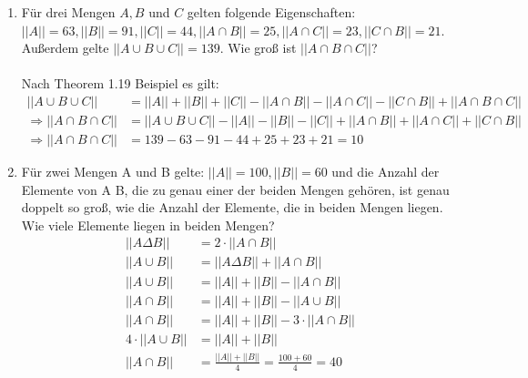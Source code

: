 \begin{enumerate}[label=(\alph*)]
        \item Für drei Mengen $A, B$ und $C$ gelten folgende Eigenschaften: 
        $||A|| = 63, ||B|| = 91, ||C|| = 44, ||A\cap B|| = 25, ||A\cap C|| = 23, ||C \cap B|| = 21$. 
        Außerdem gelte $||A\cup B\cup C|| = 139$. Wie groß ist $||A \cap B \cap C||$?\\\\
        Nach Theorem 1.19 Beispiel es gilt:
        \begin{align*}
	        ||A\cup B\cup C|| &= ||A||+||B||+||C||-||A\cap B||-||A\cap C||-||C \cap B||+||A \cap B \cap C||\\
	        \Rightarrow ||A \cap B \cap C|| &= ||A\cup B\cup C||-||A||-||B||-||C||+||A\cap B||+||A\cap C||+||C \cap B||\\
	        \Rightarrow ||A \cap B \cap C|| &= 139 - 63 - 91 - 44 + 25 + 23 + 21 = 10
        \end{align*}

        \item Für zwei Mengen A und B gelte: $||A|| = 100, ||B|| = 60$ und die Anzahl 
        der Elemente von A  B, die zu genau einer der beiden Mengen gehören, ist genau 
        doppelt so groß, wie die Anzahl der Elemente, die in beiden Mengen liegen. Wie viele Elemente 
        liegen in beiden Mengen?
        \begin{align*}
        	||A \Delta B|| &= 2 \cdot ||A \cap B|| \\
        	||A \cup B || &= ||A \Delta B|| + ||A \cap B|| \\
        	||A \cup B || &= ||A|| + ||B|| - ||A \cap B|| \\
        	||A \cap B || &= ||A|| + ||B|| - ||A \cup B|| \\
        	||A \cap B || &= ||A|| + ||B|| - 3\cdot||A \cap B|| \\
        	4 \cdot ||A \cup B || &= ||A|| + ||B|| \\
        	||A \cap B|| &= \frac{||A||+||B||}{4}= \frac{100 + 60}{4} = 40 
        \end{align*}
        

\end{enumerate}
